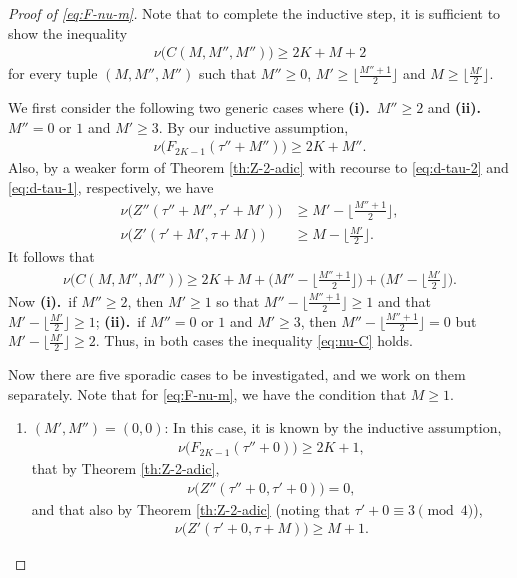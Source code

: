 \documentclass[10pt,a4paper]{amsart}
\begin{document}
\begin{proof}[Proof of \eqref{eq:F-nu-m}]
	Note that to complete the inductive step, it is sufficient to show the inequality
	\begin{align}\label{eq:nu-C}
		\nu\big(C(M,M'',M'')\big) \ge 2K+M+2
	\end{align}
	for every tuple $(M,M'',M'')$ such that $M''\ge 0$, $M'\ge \lfloor\tfrac{M''+1}{2}\rfloor$ and $M\ge \lfloor\tfrac{M'}{2}\rfloor$.
	
	We first consider the following two generic cases where \textbf{(i).}~$M''\ge 2$ and \textbf{(ii).}~$M''=0$ or $1$ and $M'\ge 3$. By our inductive assumption,
	\begin{align*}
		\nu\big(F_{2K-1}(\tau'' + M'')\big) \ge 2K + M''.
	\end{align*}
	Also, by a weaker form of Theorem \ref{th:Z-2-adic} with recourse to \eqref{eq:d-tau-2} and \eqref{eq:d-tau-1}, respectively, we have
	\begin{align*}
		\nu\big(Z''(\tau'' + M'',\tau'+M')\big) &\ge M'-\lfloor\tfrac{M''+1}{2}\rfloor,\\
		\nu\big(Z'(\tau' + M',\tau+M)\big) &\ge M-\lfloor\tfrac{M'}{2}\rfloor.
	\end{align*}
	It follows that
	\begin{align*}
		\nu\big(C(M,M'',M'')\big) \ge 2K+M+\big(M''-\lfloor\tfrac{M''+1}{2}\rfloor\big) + \big(M'-\lfloor\tfrac{M'}{2}\rfloor\big).
	\end{align*}
	Now \textbf{(i).}~if $M''\ge 2$, then $M'\ge 1$ so that $M''-\lfloor\tfrac{M''+1}{2}\rfloor\ge 1$ and that $M'-\lfloor\tfrac{M'}{2}\rfloor\ge 1$; \textbf{(ii).}~if $M''=0$ or $1$ and $M'\ge 3$, then $M''-\lfloor\tfrac{M''+1}{2}\rfloor= 0$ but $M'-\lfloor\tfrac{M'}{2}\rfloor\ge 2$. Thus, in both cases the inequality \eqref{eq:nu-C} holds.
	
	Now there are five sporadic cases to be investigated, and we work on them separately. Note that for \eqref{eq:F-nu-m}, we have the condition that $M\ge 1$.
	\begin{enumerate}[label={\textbf{(\alph*).}},leftmargin=*,labelsep=0cm,align=left]
		\item $(M',M'')=(0,0)$: In this case, it is known by the inductive assumption,
		\begin{align*}
			\nu\big(F_{2K-1}(\tau'' + 0)\big) \ge 2K + 1,
		\end{align*}
		that by Theorem \ref{th:Z-2-adic},
		\begin{align*}
			\nu\big(Z''(\tau'' + 0,\tau'+0)\big) = 0,
		\end{align*}
		and that also by Theorem \ref{th:Z-2-adic} (noting that $\tau'+0\equiv 3\pmod{4}$),
		\begin{align*}
			\nu\big(Z'(\tau' + 0,\tau+M)\big) \ge M+1.
		\end{align*}
	

\end{enumerate}
\end{proof}
\end{document}
